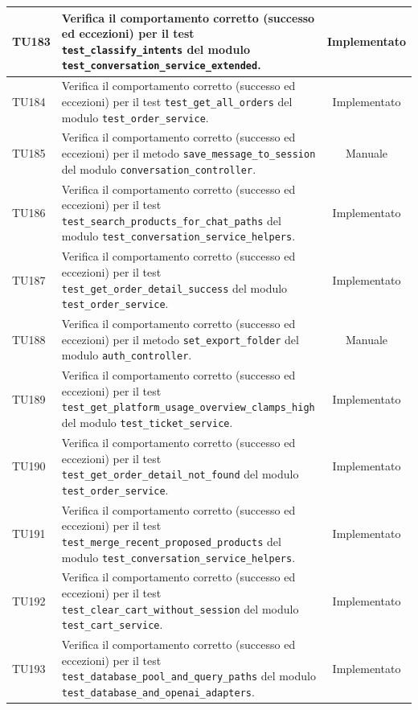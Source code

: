 \documentclass[a4paper,11pt,oneside]{scrartcl}
\begin{document}
\begin{longtable}{|p{1.9cm}|p{11.6cm}|c|}
    TU183 & Verifica il comportamento corretto (successo ed eccezioni) per il test \texttt{test\_classify\_intents} del modulo \texttt{test\_conversation\_service\_extended}. & Implementato \\ \hline
    TU184 & Verifica il comportamento corretto (successo ed eccezioni) per il test \texttt{test\_get\_all\_orders} del modulo \texttt{test\_order\_service}. & Implementato \\ \hline
    TU185 & Verifica il comportamento corretto (successo ed eccezioni) per il metodo \texttt{save\_message\_to\_session} del modulo \texttt{conversation\_controller}. & Manuale \\ \hline
    TU186 & Verifica il comportamento corretto (successo ed eccezioni) per il test \texttt{test\_search\_products\_for\_chat\_paths} del modulo \texttt{test\_conversation\_service\_helpers}. & Implementato \\ \hline
    TU187 & Verifica il comportamento corretto (successo ed eccezioni) per il test \texttt{test\_get\_order\_detail\_success} del modulo \texttt{test\_order\_service}. & Implementato \\ \hline
    TU188 & Verifica il comportamento corretto (successo ed eccezioni) per il metodo \texttt{set\_export\_folder} del modulo \texttt{auth\_controller}. & Manuale \\ \hline
    TU189 & Verifica il comportamento corretto (successo ed eccezioni) per il test \texttt{test\_get\_platform\_usage\_overview\_clamps\_high} del modulo \texttt{test\_ticket\_service}. & Implementato \\ \hline
    TU190 & Verifica il comportamento corretto (successo ed eccezioni) per il test \texttt{test\_get\_order\_detail\_not\_found} del modulo \texttt{test\_order\_service}. & Implementato \\ \hline
    TU191 & Verifica il comportamento corretto (successo ed eccezioni) per il test \texttt{test\_merge\_recent\_proposed\_products} del modulo \texttt{test\_conversation\_service\_helpers}. & Implementato \\ \hline
    TU192 & Verifica il comportamento corretto (successo ed eccezioni) per il test \texttt{test\_clear\_cart\_without\_session} del modulo \texttt{test\_cart\_service}. & Implementato \\ \hline
    TU193 & Verifica il comportamento corretto (successo ed eccezioni) per il test \texttt{test\_database\_pool\_and\_query\_paths} del modulo \texttt{test\_database\_and\_openai\_adapters}. & Implementato \\ \hline

\end{longtable}
\end{document}

